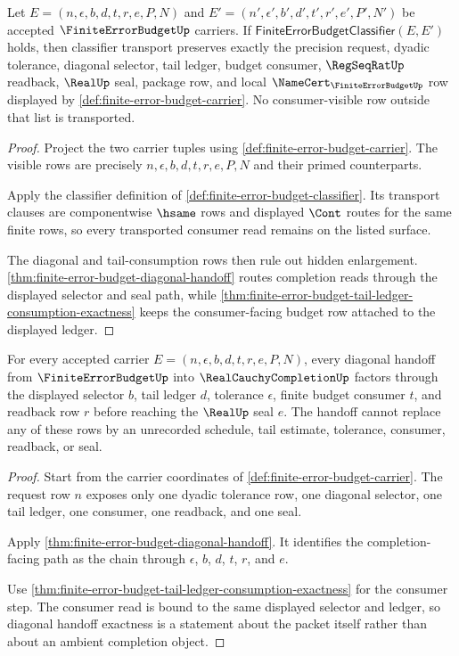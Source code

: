 \begin{theorem}
\label{thm:finite-error-budget-classifier-row-stability}
Let $E=(n,\epsilon,b,d,t,r,e,P,N)$ and
$E'=(n',\epsilon',b',d',t',r',e',P',N')$ be accepted
$\FiniteErrorBudgetUp$ carriers. If
$\mathsf{FiniteErrorBudgetClassifier}(E,E')$ holds, then classifier transport
preserves exactly the precision request, dyadic tolerance, diagonal selector,
tail ledger, budget consumer, $\RegSeqRatUp$ readback, $\RealUp$ seal,
package row, and local $\NameCert_{\FiniteErrorBudgetUp}$ row displayed by
\autoref{def:finite-error-budget-carrier}. No consumer-visible row outside
that list is transported.
\end{theorem}
\begin{proof}
Project the two carrier tuples using
\autoref{def:finite-error-budget-carrier}. The visible rows are precisely
$n,\epsilon,b,d,t,r,e,P,N$ and their primed counterparts.

Apply the classifier definition of
\autoref{def:finite-error-budget-classifier}. Its transport clauses are
componentwise $\hsame$ rows and displayed $\Cont$ routes for the same finite
rows, so every transported consumer read remains on the listed surface.

The diagonal and tail-consumption rows then rule out hidden enlargement.
\autoref{thm:finite-error-budget-diagonal-handoff} routes completion reads
through the displayed selector and seal path, while
\autoref{thm:finite-error-budget-tail-ledger-consumption-exactness} keeps the
consumer-facing budget row attached to the displayed ledger.
\end{proof}

\begin{theorem}
\label{thm:finite-error-budget-diagonal-selector-exactness}
For every accepted carrier $E=(n,\epsilon,b,d,t,r,e,P,N)$, every diagonal
handoff from $\FiniteErrorBudgetUp$ into $\RealCauchyCompletionUp$ factors
through the displayed selector $b$, tail ledger $d$, tolerance $\epsilon$,
finite budget consumer $t$, and readback row $r$ before reaching the
$\RealUp$ seal $e$. The handoff cannot replace any of these rows by an
unrecorded schedule, tail estimate, tolerance, consumer, readback, or seal.
\end{theorem}
\begin{proof}
Start from the carrier coordinates of
\autoref{def:finite-error-budget-carrier}. The request row $n$ exposes only
one dyadic tolerance row, one diagonal selector, one tail ledger, one consumer,
one readback, and one seal.

Apply \autoref{thm:finite-error-budget-diagonal-handoff}. It identifies the
completion-facing path as the chain through $\epsilon$, $b$, $d$, $t$, $r$,
and $e$.

Use \autoref{thm:finite-error-budget-tail-ledger-consumption-exactness} for
the consumer step. The consumer read is bound to the same displayed selector
and ledger, so diagonal handoff exactness is a statement about the packet
itself rather than about an ambient completion object.
\end{proof}

